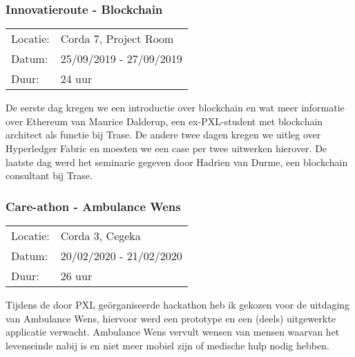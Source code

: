 \subsubsection{Innovatieroute - Blockchain}

\begin{tabular}{l l}
  Locatie: & Corda 7, Project Room\\
  Datum: & 25/09/2019 - 27/09/2019\\
  Duur: & 24 uur
\end{tabular}

De eerste dag kregen we een introductie over blockchain en wat meer informatie over Ethereum van Maurice Dalderup, een ex\hyp{}PXL\hyp{}student met blockchain architect als functie bij Trase. De andere twee dagen kregen we uitleg over Hyperledger Fabric en moesten we een case per twee uitwerken hierover. De laatste dag werd het seminarie gegeven door Hadrien van Durme, een blockchain consultant bij Trase.

\subsubsection{Care\hyp{}athon - Ambulance Wens}

\begin{tabular}{l l}
  Locatie: & Corda 3, Cegeka\\
  Datum: & 20/02/2020 - 21/02/2020\\
  Duur: & 26 uur
\end{tabular}

Tijdens de door PXL ge\"organiseerde hackathon heb ik gekozen voor de uitdaging van Ambulance Wens, hiervoor werd een prototype en een (deels) uitgewerkte applicatie verwacht. Ambulance Wens vervult wensen van mensen waarvan het levenseinde nabij is en niet meer mobiel zijn of medische hulp nodig hebben.